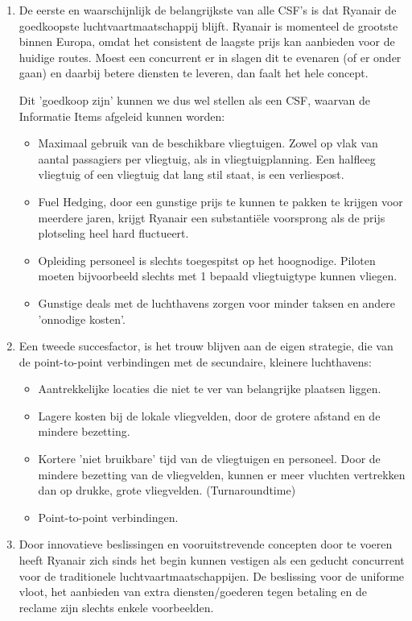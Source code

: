 \documentclass{article}
\begin{document}
\begin{enumerate}
\item De eerste en waarschijnlijk de belangrijkste van alle CSF's is dat Ryanair de goedkoopste luchtvaartmaatschappij blijft. Ryanair is momenteel de grootste binnen Europa, omdat het consistent de laagste prijs kan aanbieden voor de huidige routes. Moest een concurrent er in slagen dit te evenaren (of er onder gaan) en daarbij betere diensten te leveren, dan faalt het hele concept. 

Dit 'goedkoop zijn' kunnen we dus wel stellen als een CSF, waarvan de Informatie Items afgeleid kunnen worden:

\begin{itemize}
\item Maximaal gebruik van de beschikbare vliegtuigen. Zowel op vlak van aantal passagiers per vliegtuig, als in vliegtuigplanning. Een halfleeg vliegtuig of een vliegtuig dat lang stil staat, is een verliespost.
\item Fuel Hedging, door een gunstige prijs te kunnen te pakken te krijgen voor meerdere jaren, krijgt Ryanair een substanti\"ele voorsprong als de prijs plotseling heel hard fluctueert.
\item Opleiding personeel is slechts toegespitst op het hoognodige. Piloten moeten bijvoorbeeld slechts met 1 bepaald vliegtuigtype kunnen vliegen.
\item Gunstige deals met de luchthavens zorgen voor minder taksen en andere 'onnodige kosten'.
\end{itemize}

\item Een tweede succesfactor, is het trouw blijven aan de eigen strategie, die van de point-to-point verbindingen met de secundaire, kleinere luchthavens:

\begin{itemize}
\item Aantrekkelijke locaties die niet te ver van belangrijke plaatsen liggen.
\item Lagere kosten bij de lokale vliegvelden, door de grotere afstand en de mindere bezetting.
\item Kortere 'niet bruikbare' tijd van de vliegtuigen en personeel. Door de mindere bezetting van de vliegvelden, kunnen er meer vluchten vertrekken dan op drukke, grote vliegvelden. (Turnaroundtime)
\item Point-to-point verbindingen.
\end{itemize}

\item Door innovatieve beslissingen en vooruitstrevende concepten door te voeren heeft Ryanair zich sinds het begin kunnen vestigen als een geducht concurrent voor de traditionele luchtvaartmaatschappijen. De beslissing voor de uniforme vloot, het aanbieden van extra diensten/goederen tegen betaling en de reclame zijn slechts enkele voorbeelden.


\end{enumerate}
\end{document}
